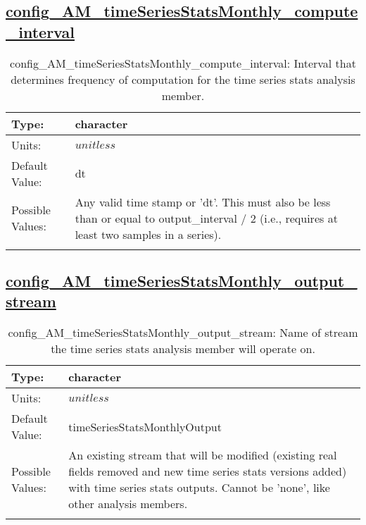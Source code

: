 \subsection[config\_AM\_timeSeriesStatsMonthly\_compute\_interval]{\hyperref[sec:nm_tab_AM_timeSeriesStatsMonthly]{config\_AM\_timeSeriesStatsMonthly\_compute\_interval}}
\label{subsec:nm_sec_config_AM_timeSeriesStatsMonthly_compute_interval}
\begin{center}
\begin{longtable}{| p{2.0in} || p{4.0in} |}
    \hline
    Type: & character \\
    \hline
    Units: & $unitless$ \\
    \hline
    Default Value: & dt \\
    \hline
    Possible Values: & Any valid time stamp or 'dt'. This must also be less than or equal to output\_interval / 2 (i.e., requires at least two samples in a series). \\
    \hline
    \caption{config\_AM\_timeSeriesStatsMonthly\_compute\_interval: Interval that determines frequency of computation for the time series stats analysis member.}
\end{longtable}
\end{center}
\subsection[config\_AM\_timeSeriesStatsMonthly\_output\_stream]{\hyperref[sec:nm_tab_AM_timeSeriesStatsMonthly]{config\_AM\_timeSeriesStatsMonthly\_output\_stream}}
\label{subsec:nm_sec_config_AM_timeSeriesStatsMonthly_output_stream}
\begin{center}
\begin{longtable}{| p{2.0in} || p{4.0in} |}
    \hline
    Type: & character \\
    \hline
    Units: & $unitless$ \\
    \hline
    Default Value: & timeSeriesStatsMonthlyOutput \\
    \hline
    Possible Values: & An existing stream that will be modified (existing real fields removed and new time series stats versions added) with time series stats outputs. Cannot be 'none', like other analysis members. \\
    \hline
    \caption{config\_AM\_timeSeriesStatsMonthly\_output\_stream: Name of stream the time series stats analysis member will operate on.}
\end{longtable}
\end{center}
